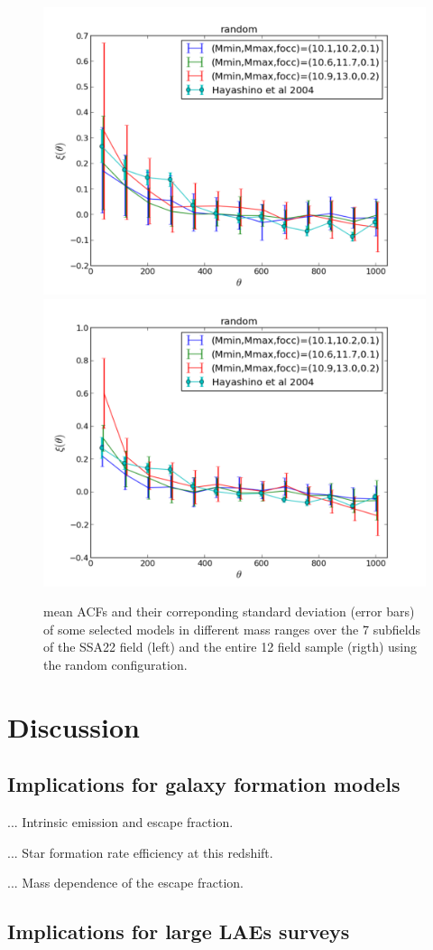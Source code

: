 \documentclass[usenatbib]{mn2e}
\begin{document}
\begin{figure}
\begin{center}
\includegraphics[width=0.46\linewidth,angle=0]{./plots/random_large_correlation_selected_models.pdf}
\hspace{5mm}
\includegraphics[width=0.46\linewidth,angle=0]{./plots/random_full_correlation_selected_models.pdf}
\end{center} 
\caption{ mean ACFs   and their correponding standard deviation (error bars)  of some selected models in different mass ranges
over the 7 subfields of the SSA22 field (left) and the entire 12 field sample (rigth) using the
random configuration. \label{figure:correlation_random} }
 
\end{figure}

\section{Discussion}

\subsection{Implications for galaxy formation models}

... Intrinsic emission and escape fraction.

... Star formation rate efficiency at this redshift.

... Mass dependence of the escape fraction.


\subsection{Implications for large LAEs surveys}
\end{document}
